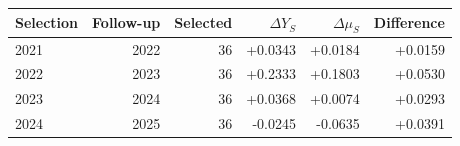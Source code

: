 \begin{tabular}{lrrrrr}
\toprule
Selection & Follow-up & Selected & $\Delta Y_S$ & $\Delta\mu_S$ & Difference \\
\midrule
2021 & 2022 & 36 & +0.0343 & +0.0184 & +0.0159 \\
2022 & 2023 & 36 & +0.2333 & +0.1803 & +0.0530 \\
2023 & 2024 & 36 & +0.0368 & +0.0074 & +0.0293 \\
2024 & 2025 & 36 & -0.0245 & -0.0635 & +0.0391 \\
\bottomrule
\end{tabular}
